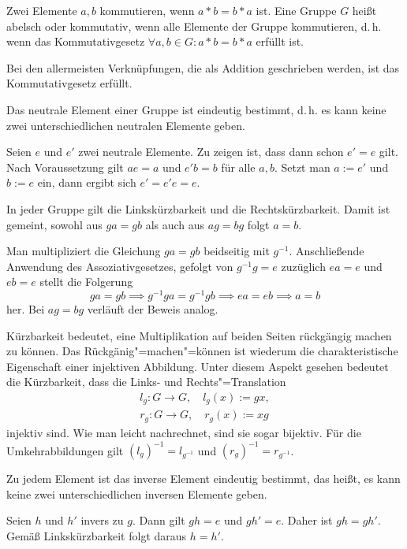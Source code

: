 \begin{Definition}\newlinefirst
Zwei Elemente $a,b$ kommutieren, wenn $a*b=b*a$ ist.
Eine Gruppe $G$ heißt abelsch oder kommutativ, wenn alle
Elemente der Gruppe kommutieren, d.\,h. wenn
das Kommutativgesetz $\forall a,b\in G\colon a*b=b*a$ erfüllt ist.
\end{Definition}
Bei den allermeisten Verknüpfungen, die als Addition 
geschrieben werden, ist das Kommutativgesetz erfüllt.

\begin{Satz} Das neutrale Element einer Gruppe ist eindeutig bestimmt,
d.\,h. es kann keine zwei unterschiedlichen neutralen Elemente geben.
\end{Satz}
\begin{Beweis}
Seien $e$ und $e'$ zwei neutrale Elemente.
Zu zeigen ist, dass dann schon $e'=e$ gilt. Nach Voraussetzung
gilt $ae=a$ und $e'b=b$ für alle $a,b$. Setzt man $a:=e'$ und
$b:=e$ ein, dann ergibt sich $e' = e'e = e.$\;\qedsymbol
\end{Beweis}

\begin{Satz}
In jeder Gruppe gilt die Linkskürzbarkeit und die Rechtskürzbarkeit.
Damit ist gemeint, sowohl aus $ga=gb$ als auch aus $ag=bg$ folgt
$a=b$.
\end{Satz}
\begin{Beweis}
Man multipliziert die Gleichung $ga=gb$ beidseitig
mit $g^{-1}$. Anschließende Anwendung des Assoziativgesetzes, gefolgt
von $g^{-1}g=e$ zuzüglich $ea=e$ und $eb=e$ stellt die Folgerung
\[ga=gb \implies g^{-1}ga=g^{-1}gb \implies ea=eb \implies a=b\]
her. Bei $ag=bg$ verläuft der Beweis analog.\,\qedsymbol
\end{Beweis}

Kürzbarkeit bedeutet, eine Multiplikation auf beiden Seiten
rückgängig machen zu können. Das Rückgänig"=machen"=können
ist wiederum die charakteristische Eigenschaft einer injektiven
Abbildung. Unter diesem Aspekt gesehen bedeutet die Kürzbarkeit,
dass die Links- und Rechts"=Translation
\begin{gather*}
\label{eq:ltrans} l_g\colon G\to G,\quad l_g(x):=gx,\\
\label{eq:rtrans} r_g\colon G\to G,\quad r_g(x):=xg
\end{gather*}
injektiv sind. Wie man leicht nachrechnet, sind sie sogar bijektiv.
Für die Umkehrabbildungen gilt $(l_g)^{-1}=l_{g^{-1}}$ und
$(r_g)^{-1}=r_{g^{-1}}$.

\begin{Satz} Zu jedem Element ist das inverse Element eindeutig
bestimmt, das heißt, es kann keine zwei unterschiedlichen inversen
Elemente geben.
\end{Satz}
\begin{Beweis}
Seien $h$ und $h'$ invers zu $g$. Dann gilt
$gh=e$ und $gh'=e$. Daher ist $gh=gh'$. Gemäß Linkskürzbarkeit
folgt daraus $h=h'$.\;\qedsymbol
\end{Beweis}

